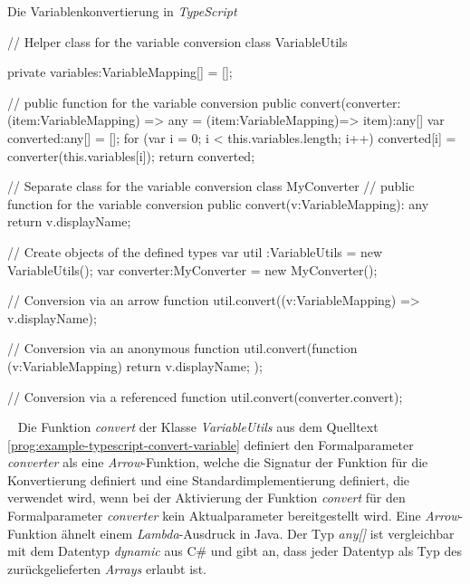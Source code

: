 \begin{program}[h]
\caption{Die Variablenkonvertierung in \emph{TypeScript}}
\label{prog:example-typescript-convert-variable}
\begin{JsCode}
// Helper class for the variable conversion
class VariableUtils {

    private variables:VariableMapping[] = [];
	
    // public function for the variable conversion
    public convert(converter:(item:VariableMapping) => any 
    	                    = (item:VariableMapping)=> item):any[] {
        var converted:any[] = [];
        for (var i = 0; i < this.variables.length; i++) {
            converted[i] = converter(this.variables[i]);
        }
        return converted;	            
    } 
    
}

// Separate class for the variable conversion
class MyConverter {
    // public function for the variable conversion
    public convert(v:VariableMapping): any {
        return v.displayName;
    }    
}

// Create objects of the defined types
var util     :VariableUtils = new VariableUtils();
var converter:MyConverter   = new MyConverter();

// Conversion via an arrow function
util.convert((v:VariableMapping) => v.displayName);

// Conversion via an anonymous function
util.convert(function (v:VariableMapping) { return v.displayName; });

// Conversion via a referenced function
util.convert(converter.convert);
\end{JsCode} 
\end{program}
\ \newline
Die Funktion \emph{convert} der Klasse \emph{VariableUtils} aus dem Quelltext \ref{prog:example-typescript-convert-variable} definiert den Formalparameter \emph{converter} als eine \emph{Arrow}-Funktion, welche die Signatur der Funktion für die Konvertierung definiert und eine Standardimplementierung definiert, die verwendet wird, wenn bei der Aktivierung der Funktion \emph{convert} für den Formalparameter \emph{converter} kein Aktualparameter bereitgestellt wird. Eine \emph{Arrow}-Funktion ähnelt einem \emph{Lambda}-Ausdruck in Java. Der Typ \emph{any[]} ist vergleichbar mit dem Datentyp \emph{dynamic} aus C\# und gibt an, dass jeder Datentyp als Typ des zurückgelieferten \emph{Arrays} erlaubt ist.

